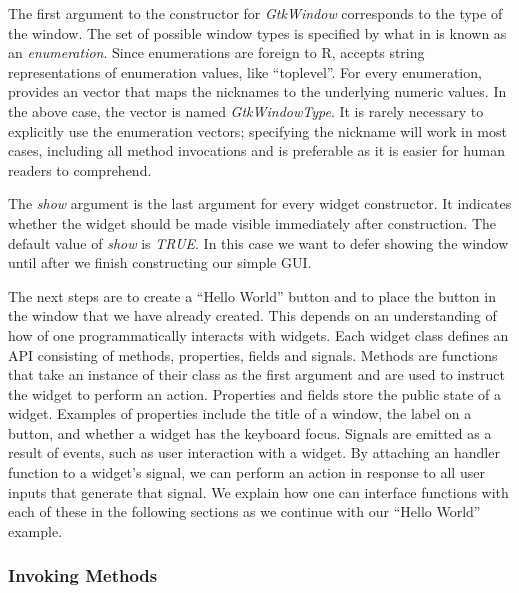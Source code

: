 \documentclass[article]{jss}
\begin{document}
The first argument to the constructor for \emph{GtkWindow} corresponds
to the type of the window. The set of possible window types is
specified by what in  is known as an
\emph{enumeration}. Since enumerations are foreign to R, 
accepts string representations of enumeration values, like
``toplevel''. For every  enumeration,  provides
an  vector that maps the nicknames to the underlying
numeric values.  In the above case, the vector is named
\emph{GtkWindowType}. It is rarely necessary to explicitly use the
enumeration vectors; specifying the nickname will work in most cases,
including all method invocations and is preferable as it is easier for
human readers to comprehend.

The \emph{show} argument is the last argument for every widget
constructor. It
indicates whether the widget should be made visible immediately after
construction.
The default value of \emph{show} is \emph{TRUE}. In this case we want
to
defer showing the window until after we finish constructing our simple
GUI.

The next steps are to create a ``Hello World'' button and to place the
button in the window that we have already created. This depends on an
understanding of how of one programmatically interacts with widgets.
Each widget class defines an API 
consisting of methods, properties, fields and signals. Methods are
functions 
that take an instance of their class as the first argument and are
used to instruct the 
widget to perform an action. Properties and fields store the public
state of a widget. Examples of properties include the title of a
window, the label on a button, and whether a widget has the keyboard
focus. 
Signals are emitted as a result of events, such as user interaction
with a widget.
By attaching an  handler function to a widget's signal, we
can
perform an action in response to all user inputs that generate that
signal. We explain how one can interface  functions with
each of these in the following sections as we continue with our
``Hello World'' example.

\subsubsection{Invoking Methods}
\end{document}
